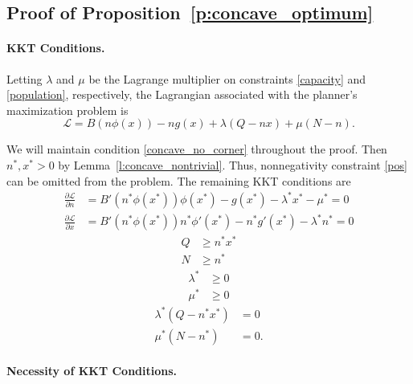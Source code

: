 \documentclass[12pt]{article}
\newcommand{\efficacy}{\phi}
\newcommand{\general}{g}
\newcommand{\benefit}{B}
\newcommand{\lagrangian}{\mathscr{L}}
\begin{document}

\subsection*{Proof of Proposition~\ref{p:concave_optimum}}

\paragraph{KKT Conditions.}

Letting $\lambda$ and $\mu$ be the Lagrange multiplier on constraints
\eqref{capacity} and \eqref{population}, respectively, the Lagrangian
associated with the planner's maximization problem is
\begin{equation}
\label{a:Lagrangian}
\lagrangian = B(n \efficacy(x)) - n\general(x) + \lambda(Q - nx)
+ \mu(N - n).
\end{equation}

We will maintain condition \eqref{concave_no_corner} throughout the
proof. Then $n^*, x^* > 0$ by Lemma~\ref{l:concave_nontrivial}.  Thus,
nonnegativity constraint \eqref{pos} can be omitted from the
problem. The remaining KKT conditions are
\begin{align}
\frac{\partial \lagrangian}{\partial n} & = \benefit'(n^* \efficacy(x^*)) \efficacy(x^*) - \general(x^*) - \lambda^* x^* - \mu^* = 0 \label{a:partial_L_partial_n} \\
\frac{\partial \lagrangian}{\partial x} & = \benefit'(n^* \efficacy(x^*)) n^* \efficacy'(x^*) - n^* \general'(x^*) - \lambda^* n^* = 0 \label{a:partial_L_partial_x} 
\end{align}
\begin{align}
Q & \geq n^* x^*  \label{a:KKT_capacity} \\
N & \geq n^*  \label{a:KKT_population}
\end{align}
\begin{align}
\lambda^* & \geq 0 \label{a:lambda} \\
\mu^* & \geq 0 \label{a:mu}
\end{align}
\begin{align}
\lambda^* (Q - n^* x^*) & = 0 \label{a:cs_capacity} \\
\mu^* (N - n^*) & = 0. \label{a:cs_population}
\end{align}

\paragraph{Necessity of KKT Conditions.}
\end{document}
